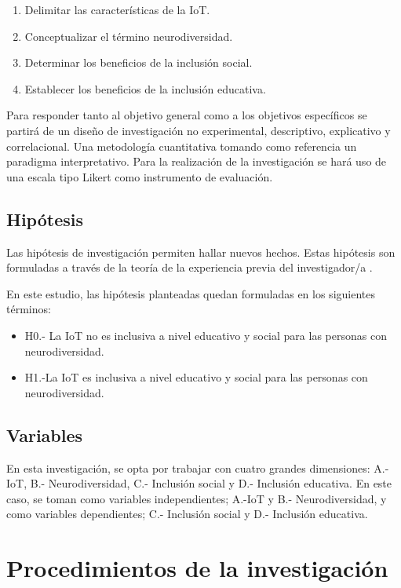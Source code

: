\documentclass[spanish]{textolivre}
\begin{document}
\begin{enumerate}
    \item Delimitar las características de la IoT.
    \item Conceptualizar el término neurodiversidad.
    \item Determinar los beneficios de la inclusión social.
    \item Establecer los beneficios de la inclusión educativa.
\end{enumerate}

Para responder tanto al objetivo general como a los objetivos específicos se partirá de un diseño de investigación no experimental, descriptivo, explicativo y correlacional. Una metodología cuantitativa tomando como referencia un paradigma interpretativo. Para la realización de la investigación se hará uso de una escala tipo Likert como instrumento de evaluación.

\subsection{Hipótesis}

Las hipótesis de investigación permiten hallar nuevos hechos. Estas hipótesis son formuladas a través de la teoría de la experiencia previa del investigador/a \cite{behar_metodologiinvestigacion_2008,cazau_fundamentos_2006}.

En este estudio, las hipótesis planteadas quedan formuladas en los siguientes términos:

\begin{itemize}
    \item H0.- La IoT no es inclusiva a nivel educativo y social para las personas con neurodiversidad.
    \item H1.-La IoT es inclusiva a nivel educativo y social para las personas con neurodiversidad.
\end{itemize}

\subsection{Variables}

En esta investigación, se opta por trabajar con cuatro grandes dimensiones: A.- IoT, B.- Neurodiversidad, C.- Inclusión social y D.- Inclusión educativa. En este caso, se toman como variables independientes; A.-IoT y B.- Neurodiversidad, y como variables dependientes; C.- Inclusión social y D.- Inclusión educativa.

\section{Procedimientos de la investigación}
\end{document}
